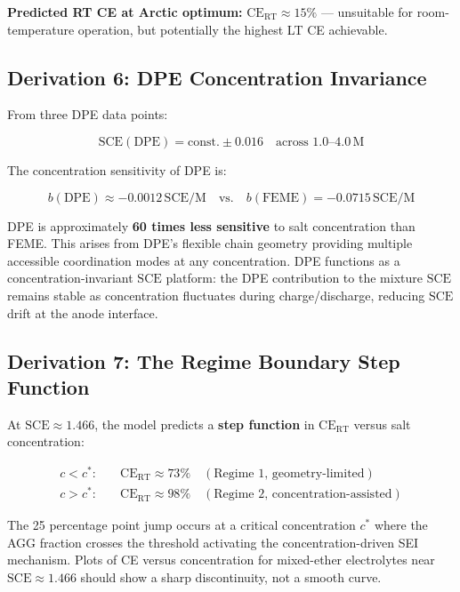 \documentclass[12pt,letterpaper]{article}
\newcommand{\mSCE}{\mathrm{SCE}}
\newcommand{\mCERT}{\mathrm{CE}_{\mathrm{RT}}}
\begin{document}
\textbf{Predicted RT CE at Arctic optimum:}
$\mCERT \approx 15\%$ --- unsuitable for
room-temperature operation, but potentially the highest
LT CE achievable.

\subsection{Derivation 6: DPE Concentration Invariance}
\label{sec:dpe}

From three DPE data points:

\begin{equation}
  \mSCE(\text{DPE}) = \text{const.} \pm 0.016
  \quad \text{across } 1.0\text{--}4.0\,\mathrm{M}
\end{equation}

The concentration sensitivity of DPE is:

\begin{equation}
  b(\text{DPE}) \approx -0.0012\,\mSCE/\text{M}
  \quad \text{vs.} \quad
  b(\text{FEME}) = -0.0715\,\mSCE/\text{M}
\end{equation}

DPE is approximately \textbf{60 times less sensitive}
to salt concentration than FEME.
This arises from DPE's flexible chain geometry providing
multiple accessible coordination modes at any
concentration.
DPE functions as a concentration-invariant $\mSCE$
platform: the DPE contribution to the mixture $\mSCE$
remains stable as concentration fluctuates during
charge/discharge, reducing $\mSCE$ drift at the anode
interface.

\subsection{Derivation 7: The Regime Boundary
Step Function}
\label{sec:step}

At $\mSCE \approx 1.466$, the model predicts a
\textbf{step function} in $\mCERT$ versus salt
concentration:

\begin{align}
  c < c^{*}: &\quad \mCERT \approx 73\%
  \quad (\text{Regime~1, geometry-limited})\\
  c > c^{*}: &\quad \mCERT \approx 98\%
  \quad (\text{Regime~2, concentration-assisted})
\end{align}

The 25 percentage point jump occurs at a critical
concentration $c^{*}$ where the AGG fraction crosses
the threshold activating the concentration-driven SEI
mechanism.
Plots of CE versus concentration for mixed-ether
electrolytes near $\mSCE \approx 1.466$ should show a
sharp discontinuity, not a smooth curve.
\end{document}
